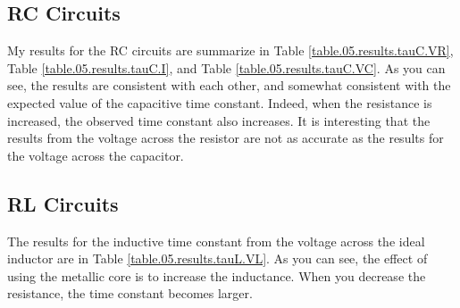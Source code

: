 \subsection{RC Circuits}
%
My results for the RC circuits are summarize in Table \ref{table.05.results.tauC.VR}, Table \ref{table.05.results.tauC.I}, and Table \ref{table.05.results.tauC.VC}. As you can see, the results are consistent with each other, and somewhat consistent with the expected value of the capacitive time constant. Indeed, when the resistance is increased, the observed time constant also increases. It is interesting that the results from the voltage across the resistor are not as accurate as the results for the voltage across the capacitor.
%
\subsection{RL Circuits}
%
The results for the inductive time constant from the voltage across the ideal inductor are in Table \ref{table.05.results.tauL.VL}. As you can see, the effect of using the metallic core is to increase the inductance. When you decrease the resistance, the time constant becomes larger.
%
